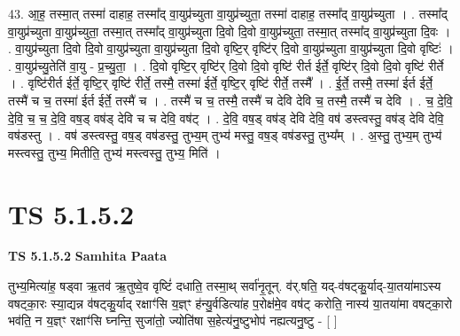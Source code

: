 \documentclass[17pt]{extarticle}
\begin{document}
43. आ॒ह॒ तस्मा॒त् तस्मा॑ दाहाह॒ तस्मा᳚द् वा॒युप्र॑च्युता वा॒युप्र॑च्युता॒ तस्मा॑ दाहाह॒ तस्मा᳚द् वा॒युप्र॑च्युता । . तस्मा᳚द् वा॒युप्र॑च्युता वा॒युप्र॑च्युता॒ तस्मा॒त् तस्मा᳚द् वा॒युप्र॑च्युता दि॒वो दि॒वो वा॒युप्र॑च्युता॒ तस्मा॒त् तस्मा᳚द् वा॒युप्र॑च्युता दि॒वः । . वा॒युप्र॑च्युता दि॒वो दि॒वो वा॒युप्र॑च्युता वा॒युप्र॑च्युता दि॒वो वृष्टि॒र् वृष्टि॑र् दि॒वो वा॒युप्र॑च्युता वा॒युप्र॑च्युता दि॒वो वृष्टिः॑ । . वा॒युप्र॑च्यु॒तेति॑ वा॒यु - प्र॒च्यु॒ता॒ । . दि॒वो वृष्टि॒र् वृष्टि॑र् दि॒वो दि॒वो वृष्टि॑ रीर्त ईर्ते॒ वृष्टि॑र् दि॒वो दि॒वो वृष्टि॑ रीर्ते । . वृष्टि॑रीर्त ईर्ते॒ वृष्टि॒र् वृष्टि॑ रीर्ते॒ तस्मै॒ तस्मा॑ ईर्ते॒ वृष्टि॒र् वृष्टि॑ रीर्ते॒ तस्मै᳚ । . ई॒र्ते॒ तस्मै॒ तस्मा॑ ईर्त ईर्ते॒ तस्मै॑ च च॒ तस्मा॑ ईर्त ईर्ते॒ तस्मै॑ च । . तस्मै॑ च च॒ तस्मै॒ तस्मै॑ च देवि देवि च॒ तस्मै॒ तस्मै॑ च देवि । . च॒ दे॒वि॒ दे॒वि॒ च॒ च॒ दे॒वि॒ वष॒ड् वष॑ड् देवि च च देवि॒ वष॑ट् । . दे॒वि॒ वष॒ड् वष॑ड् देवि देवि॒ वष॑ डस्त्वस्तु॒ वष॑ड् देवि देवि॒ वष॑डस्तु । . वष॑ डस्त्वस्तु॒ वष॒ड् वष॑डस्तु॒ तुभ्य॒म् तुभ्य॑ मस्तु॒ वष॒ड् वष॑डस्तु॒ तुभ्य᳚म् । . अ॒स्तु॒ तुभ्य॒म् तुभ्य॑ मस्त्वस्तु॒ तुभ्य॒ मितीति॒ तुभ्य॑ मस्त्वस्तु॒ तुभ्य॒ मिति॑ । \newline
\pagebreak
{}

\section{ TS 5.1.5.2 }

\textbf{TS 5.1.5.2 } \newline
\textbf{Samhita Paata} \newline

तुभ्य॒मित्या॑ह॒ षड्वा ऋ॒तव॑ ऋ॒तुष्वे॒व वृष्टिं॑ दधाति॒ तस्मा॒थ् सर्वा॑नृ॒तून्. व॑र्.षति॒ यद्-व॑षट्कु॒र्याद्-या॒तया॑माऽस्य वषट्का॒रः स्या॒द्यन्न व॑षट्कु॒र्याद् रक्षाꣳ॑सि य॒ज्ञ्ꣳ ह॑न्यु॒र्वडित्या॑ह प॒रोक्ष॑मे॒व वष॑ट् करोति॒ नास्य॑ या॒तया॑मा वषट्का॒रो भव॑ति॒ न य॒ज्ञ्ꣳ रक्षाꣳ॑सि घ्नन्ति॒ सुजा॑तो॒ ज्योति॑षा स॒हेत्य॑नु॒ष्टुभोप॑ नह्यत्यनु॒ष्टु - [  ] \newline
\end{document}

